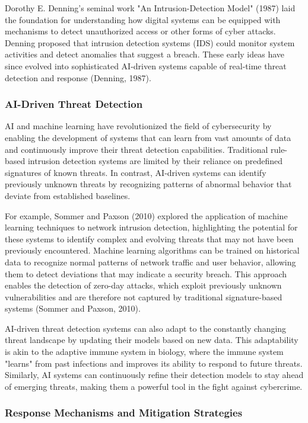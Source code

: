 \documentclass[12pt,twoside]{article}
\begin{document}
Dorothy E. Denning's seminal work "An Intrusion-Detection Model" (1987) laid the foundation for understanding how digital systems can be equipped with mechanisms to detect unauthorized access or other forms of cyber attacks. Denning proposed that intrusion detection systems (IDS) could monitor system activities and detect anomalies that suggest a breach. These early ideas have since evolved into sophisticated AI-driven systems capable of real-time threat detection and response (Denning, 1987).

\subsubsection{AI-Driven Threat Detection}

AI and machine learning have revolutionized the field of cybersecurity by enabling the development of systems that can learn from vast amounts of data and continuously improve their threat detection capabilities. Traditional rule-based intrusion detection systems are limited by their reliance on predefined signatures of known threats. In contrast, AI-driven systems can identify previously unknown threats by recognizing patterns of abnormal behavior that deviate from established baselines.

For example, Sommer and Paxson (2010) explored the application of machine learning techniques to network intrusion detection, highlighting the potential for these systems to identify complex and evolving threats that may not have been previously encountered. Machine learning algorithms can be trained on historical data to recognize normal patterns of network traffic and user behavior, allowing them to detect deviations that may indicate a security breach. This approach enables the detection of zero-day attacks, which exploit previously unknown vulnerabilities and are therefore not captured by traditional signature-based systems (Sommer and Paxson, 2010).

AI-driven threat detection systems can also adapt to the constantly changing threat landscape by updating their models based on new data. This adaptability is akin to the adaptive immune system in biology, where the immune system "learns" from past infections and improves its ability to respond to future threats. Similarly, AI systems can continuously refine their detection models to stay ahead of emerging threats, making them a powerful tool in the fight against cybercrime.

\subsubsection{Response Mechanisms and Mitigation Strategies}
\end{document}
